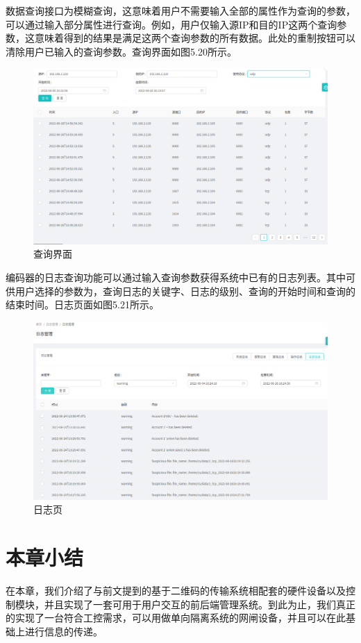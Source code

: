 数据查询接口为模糊查询，这意味着用户不需要输入全部的属性作为查询的参数，可以通过输入部分属性进行查询。例如，用户仅输入源IP和目的IP这两个查询参数，这意味着得到的结果是满足这两个查询参数的所有数据。此处的重制按钮可以清除用户已输入的查询参数。查询界面如图5.20所示。

\begin{figure}[!htbp]
\centering
\includegraphics[scale=0.6]{figures/HW/N13.png}
\caption{查询界面}
\end{figure}

编码器的日志查询功能可以通过输入查询参数获得系统中已有的日志列表。其中可供用户选择的参数为，查询日志的关键字、日志的级别、查询的开始时间和查询的结束时间。日志页面如图5.21所示。

\begin{figure}[!htbp]
\centering
\includegraphics[scale=0.6]{figures/HW/N14.png}
\caption{日志页}
\end{figure}

\section{本章小结}

在本章，我们介绍了与前文提到的基于二维码的传输系统相配套的硬件设备以及控制模块，并且实现了一套可用于用户交互的前后端管理系统。到此为止，我们真正的实现了一台符合工控需求，可以用做单向隔离系统的网闸设备，并且可以在此基础上进行信息的传递。